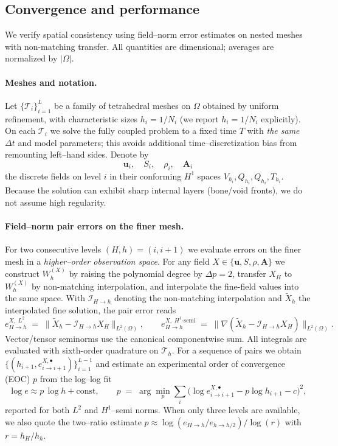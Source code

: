 \subsection*{Convergence and performance}

We verify spatial consistency using field–norm error estimates on nested meshes with non-matching transfer. All quantities are dimensional; averages are normalized by $|\Omega|$.

\paragraph{Meshes and notation.}
Let $\{\mathcal{T}_i\}_{i=1}^L$ be a family of tetrahedral meshes on $\Omega$ obtained by uniform refinement, with characteristic sizes $h_i=1/N_i$ (we report $h_i=1/N_i$ explicitly). On each $\mathcal{T}_i$ we solve the fully coupled problem to a fixed time $T$ with \emph{the same} $\Delta t$ and model parameters; this avoids additional time–discretization bias from remounting left–hand sides. Denote by
\[
\mathbf{u}_i,\quad S_i,\quad \rho_i,\quad \mathbf{A}_i
\]
the discrete fields on level $i$ in their conforming $H^1$ spaces $V_{h_i},Q_{h_i},Q_{h_i},T_{h_i}$. Because the solution can exhibit sharp internal layers (bone/void fronts), we do not assume high regularity.

\paragraph{Field–norm pair errors on the finer mesh.}
For two consecutive levels $(H,h)=(i,i{+}1)$ we evaluate errors on the finer mesh in a \emph{higher–order observation space}. For any field $X\in\{\mathbf{u},S,\rho,\mathbf{A}\}$ we construct $W_{h}^{(X)}$ by raising the polynomial degree by $\Delta p=2$, transfer $X_H$ to $W_{h}^{(X)}$ by non-matching interpolation, and interpolate the fine-field values into the same space. With $\mathcal{I}_{H\to h}$ denoting the non-matching interpolation and $\widetilde X_h$ the interpolated fine solution, the pair error reads
\[
e_{H\to h}^{X,\;L^2} \;=\; \big\| \widetilde X_h - \mathcal{I}_{H\to h} X_H \big\|_{L^2(\Omega)},
\qquad
e_{H\to h}^{X,\;H^1\text{-semi}} \;=\; \big\| \nabla(\widetilde X_h - \mathcal{I}_{H\to h} X_H) \big\|_{L^2(\Omega)} .
\]
Vector/tensor seminorms use the canonical componentwise sum. All integrals are evaluated with sixth-order quadrature on $\mathcal{T}_h$. For a sequence of pairs we obtain $\{(h_{i+1},e_{i\to i+1}^{X,\bullet})\}_{i=1}^{L-1}$ and estimate an experimental order of convergence (EOC) $p$ from the log–log fit
\[
\log e \approx p\,\log h + \mathrm{const},\qquad
p \;=\; \arg\min_{p} \sum_{i} \big(\log e_{i\to i+1}^{X,\bullet} - p\log h_{i+1} - c\big)^2 ,
\]
reported for both $L^2$ and $H^1$–semi norms. When only three levels are available, we also quote the two–ratio estimate $p \approx \log(e_{H\to h}/e_{h\to h/2})/\log(r)$ with $r=h_H/h_h$.



